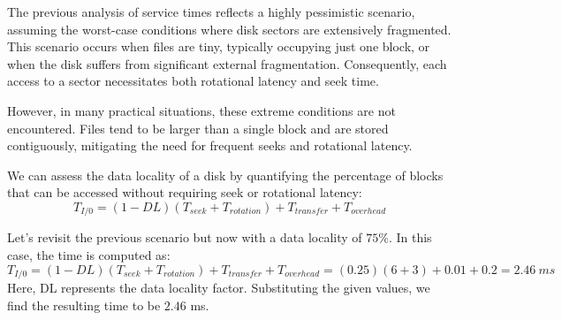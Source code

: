 The previous analysis of service times reflects a highly pessimistic scenario, assuming the worst-case conditions where disk sectors are extensively fragmented. 
This scenario occurs when files are tiny, typically occupying just one block, or when the disk suffers from significant external fragmentation. 
Consequently, each access to a sector necessitates both rotational latency and seek time.

However, in many practical situations, these extreme conditions are not encountered. 
Files tend to be larger than a single block and are stored contiguously, mitigating the need for frequent seeks and rotational latency.

We can assess the data locality of a disk by quantifying the percentage of blocks that can be accessed without requiring seek or rotational latency: 
\[T_{I/0}=(1-DL)(T_{seek}+T_{rotation})+T_{transfer}+T_{overhead}\]
\begin{example}
    Let's revisit the previous scenario but now with a data locality of $75\%$. 
    In this case, the time is computed as:
    \[T_{I/0}=(1-DL)(T_{seek}+T_{rotation})+T_{transfer}+T_{overhead}=(0.25)(6+3)+0.01+0.2=2.46\:ms\]
    Here, DL represents the data locality factor. 
    Substituting the given values, we find the resulting time to be $2.46$ ms.
\end{example}

